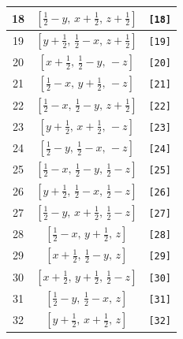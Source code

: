 \documentclass[fleqn,8pt]{jsarticle}
\begin{document}
\begin{longtable}{ccc}
18 & $\left[ \frac{1}{2} - y,\, x + \frac{1}{2},\, z + \frac{1}{2} \right]$ & {\tt [18]} \\ \hline
19 & $\left[ y + \frac{1}{2},\, \frac{1}{2} - x,\, z + \frac{1}{2} \right]$ & {\tt [19]} \\ \hline
20 & $\left[ x + \frac{1}{2},\, \frac{1}{2} - y,\, - z \right]$ & {\tt [20]} \\ \hline
21 & $\left[ \frac{1}{2} - x,\, y + \frac{1}{2},\, - z \right]$ & {\tt [21]} \\ \hline
22 & $\left[ \frac{1}{2} - x,\, \frac{1}{2} - y,\, z + \frac{1}{2} \right]$ & {\tt [22]} \\ \hline
23 & $\left[ y + \frac{1}{2},\, x + \frac{1}{2},\, - z \right]$ & {\tt [23]} \\ \hline
24 & $\left[ \frac{1}{2} - y,\, \frac{1}{2} - x,\, - z \right]$ & {\tt [24]} \\ \hline
25 & $\left[ \frac{1}{2} - x,\, \frac{1}{2} - y,\, \frac{1}{2} - z \right]$ & {\tt [25]} \\ \hline
26 & $\left[ y + \frac{1}{2},\, \frac{1}{2} - x,\, \frac{1}{2} - z \right]$ & {\tt [26]} \\ \hline
27 & $\left[ \frac{1}{2} - y,\, x + \frac{1}{2},\, \frac{1}{2} - z \right]$ & {\tt [27]} \\ \hline
28 & $\left[ \frac{1}{2} - x,\, y + \frac{1}{2},\, z \right]$ & {\tt [28]} \\ \hline
29 & $\left[ x + \frac{1}{2},\, \frac{1}{2} - y,\, z \right]$ & {\tt [29]} \\ \hline
30 & $\left[ x + \frac{1}{2},\, y + \frac{1}{2},\, \frac{1}{2} - z \right]$ & {\tt [30]} \\ \hline
31 & $\left[ \frac{1}{2} - y,\, \frac{1}{2} - x,\, z \right]$ & {\tt [31]} \\ \hline
32 & $\left[ y + \frac{1}{2},\, x + \frac{1}{2},\, z \right]$ & {\tt [32]} \\
\end{longtable}
\end{document}

